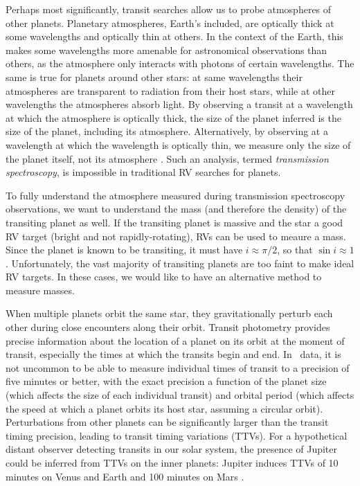 Perhaps most significantly, transit searches allow us to probe atmospheres of
other planets.
Planetary atmospheres, Earth's included, are optically thick at some wavelengths and
optically thin at others. 
In the context of the Earth, this makes some wavelengths more amenable for astronomical
observations than others, as the atmosphere only interacts with photons of certain wavelengths.
The same is true for planets around other stars: at same wavelengths their atmospheres
are transparent to radiation from their host stars, while at other wavelengths
the atmospheres absorb light.
By observing a transit at a wavelength at which the atmosphere is optically thick, the
size of the planet inferred is the size of the planet, including its atmosphere.
Alternatively, by observing at a wavelength at which the wavelength is optically thin,
we measure only the size of the planet itself, not its atmosphere \citep[e.g.][]{Knutson11, Knutson14}. 
Such an analysis, termed \textit{transmission spectroscopy}, is impossible in traditional RV searches for planets.

To fully understand the atmosphere measured during transmission spectroscopy observations,
we want to understand the mass (and therefore the density) of the transiting planet as
well.
If the transiting planet is massive and the star a good RV target (bright and not 
rapidly-rotating), RVs can be used to meaure a mass. 
Since the planet is known to be transiting, it must have $i \approx \pi/2$, so that
$\sin i \approx 1$. 
Unfortunately, the vast majority of transiting planets are too faint to make ideal
RV targets.
In these cases, we would like to have an alternative method to measure masses.

When multiple planets orbit the same star, they gravitationally perturb each other
during close encounters along their orbit.
Transit photometry provides precise information about the location of a planet on its 
orbit at the moment of transit, especially the times at which the transits
begin and end.
In \kep\ data, it is not uncommon to be able to measure individual times of transit to a
precision of five minutes or better, with the exact precision a function of the 
planet size (which affects the size of each individual transit) and orbital period
(which affects the speed at which a planet orbits its host star, assuming a 
circular orbit).
Perturbations from other planets can be significantly larger than the transit timing
precision, leading to transit timing variations (TTVs). 
For a hypothetical distant observer detecting transits in our solar system, the
presence of Jupiter could be inferred from TTVs on the inner planets: 
Jupiter induces TTVs of 10 minutes on Venus and Earth and 100 minutes on Mars
\citep{Agol05, Holman05}.

